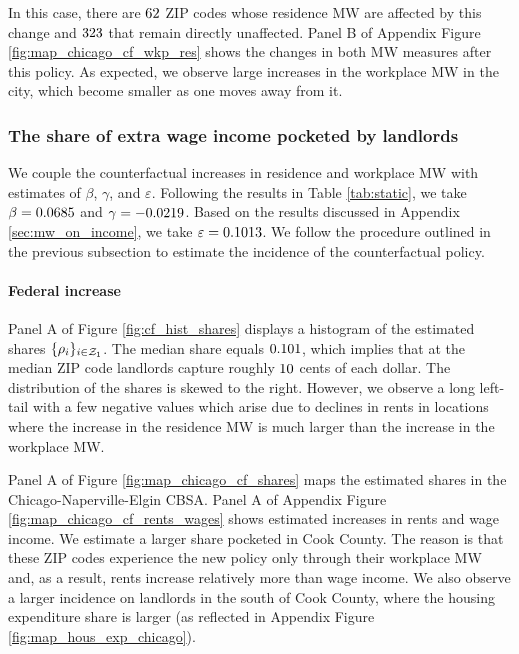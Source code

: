 In this case, there are $\textnormal{62}$ ZIP codes whose 
residence MW are affected by this change and $\textnormal{323}$ 
that remain directly unaffected.
Panel B of Appendix Figure \ref{fig:map_chicago_cf_wkp_res} shows the changes 
in both MW measures after this policy.
As expected, we observe large increases in the workplace MW in the city, 
which become smaller as one moves away from it.

\subsubsection{The share of extra wage income pocketed by landlords}
\label{sec:cf_rents_and_wage_changes}

We couple the counterfactual increases in residence and workplace MW with 
estimates of $\beta$, $\gamma$, and $\varepsilon$.
Following the results in Table \ref{tab:static}, we take 
$\beta = 0.0685$ and 
$\gamma = -0.0219$.
Based on the results discussed in Appendix \ref{sec:mw_on_income}, we take
$\varepsilon = 0.1013$.
We follow the procedure outlined in the previous subsection to estimate the 
incidence of the counterfactual policy.

\paragraph{Federal increase}

Panel A of Figure \ref{fig:cf_hist_shares} displays a histogram of the
estimated shares $\{\rho_i\}_{i\in\mathcal{Z}_1}$.
The median share equals $\textnormal{0.101}$, which implies that at the median 
ZIP code landlords capture roughly $\textnormal{10}$ cents of each dollar.
The distribution of the shares is skewed to the right.
However, we observe a long left-tail with a few negative values which arise due 
to declines in rents in locations where the increase in the residence MW is much 
larger than the increase in the workplace MW.

Panel A of Figure \ref{fig:map_chicago_cf_shares} maps the estimated shares 
in the Chicago-Naperville-Elgin CBSA.
Panel A of Appendix Figure \ref{fig:map_chicago_cf_rents_wages} shows
estimated increases in rents and wage income.
We estimate a larger share pocketed in Cook County.
The reason is that these ZIP codes experience the new policy only through
their workplace MW and, as a result, rents increase relatively more than
wage income.
We also observe a larger incidence on landlords in the south of Cook County,
where the housing expenditure share is larger 
(as reflected in Appendix Figure \ref{fig:map_hous_exp_chicago}).

